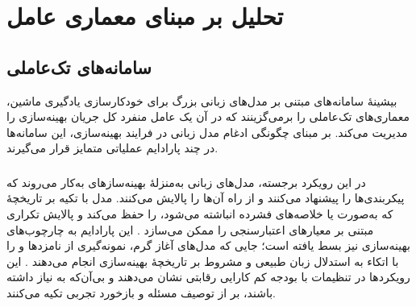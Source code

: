
\section{تحلیل بر مبنای معماری عامل}

\subsection{سامانه‌های تک‌عاملی}

بیشینهٔ سامانه‌های مبتنی بر مدل‌های زبانی بزرگ برای خودکارسازی یادگیری ماشین، معماری‌های تک‌عاملی را برمی‌گزینند که در آن یک عامل منفرد کل جریان بهینه‌سازی را مدیریت می‌کند. بر مبنای چگونگی ادغام مدل زبانی در فرایند بهینه‌سازی، این سامانه‌ها در چند پارادایم عملیاتی متمایز قرار می‌گیرند.

\subsubsection{\protect{}}
در این رویکرد برجسته، مدل‌های زبانی به‌منزلهٔ بهینه‌سازهای  به‌کار می‌روند که پیکربندی‌ها را پیشنهاد می‌کنند و از راه  آن‌ها را پالایش می‌کنند. مدل با تکیه بر تاریخچهٔ  که به‌صورت  یا خلاصه‌های فشرده انباشته می‌شود،  را حفظ می‌کند و پالایش تکراری مبتنی بر معیارهای اعتبارسنجی را ممکن می‌سازد \cite{zhang2023usingLLMforHPO, zheng2023GENIUS}. این پارادایم به چارچوب‌های بهینه‌سازی  نیز بسط یافته است؛ جایی که مدل‌های آغاز گرم، نمونه‌گیری از نامزدها و  را با اتکاء به استدلال زبان طبیعی و مشروط بر تاریخچهٔ بهینه‌سازی انجام می‌دهند \cite{liu2024LLAMBO}. این رویکردها در تنظیمات با بودجه کم کارایی رقابتی نشان می‌دهند و بی‌آن‌که به  نیاز داشته باشند، بر  از توصیف مسئله و بازخورد تجربی تکیه می‌کنند.

